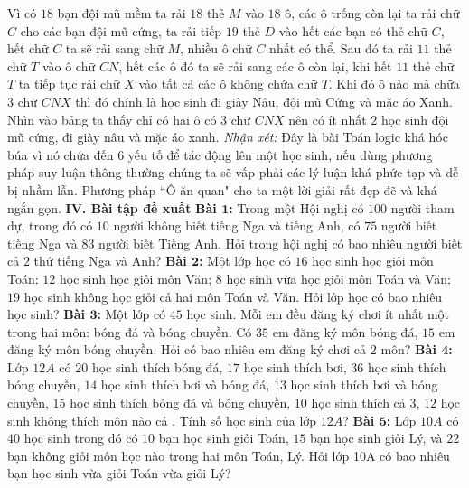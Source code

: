 \begin{multicols}{2}
\begin{figure}[H]
		\vspace*{-15pt}
	\end{figure}
	Vì có $18$ bạn đội mũ mềm ta rải $18$ thẻ $M$ vào $18$ ô, các ô trống còn lại ta rải chữ $C$ cho các bạn đội mũ cứng, ta rải tiếp $19$ thẻ $D$ vào hết các bạn có thẻ chữ $C$, hết chữ $C$ ta sẽ rải sang chữ $M$, nhiều ô chữ $C$ nhất có thể. Sau đó ta rải $11$ thẻ chữ $T$ vào ô chữ $CN$, hết các ô đó ta sẽ rải sang các ô còn lại, khi hết $11$ thẻ chữ $T$ ta tiếp tục rải chữ $X$ vào tất cả các ô không chứa chữ $T$. Khi đó ô nào mà chữa $3$ chữ $CNX$ thì đó chính là học sinh đi giày Nâu, đội mũ Cứng và mặc áo Xanh.
	\vskip 0.1cm
	Nhìn vào bảng ta thấy chỉ có hai ô có $3$ chữ $CNX$ nên có ít nhất $2$ học sinh đội mũ cứng, đi giày nâu và mặc áo xanh.
	\vskip 0.1cm
	\textit{Nhận xét:} Đây là bài Toán logic khá hóc búa vì nó chứa đến $6$ yếu tố để tác động lên một học sinh, nếu dùng phương pháp suy luận thông thường chúng ta sẽ vấp phải các lý luận khá phức tạp và dễ bị nhầm lẫn. Phương pháp ``Ô ăn quan" cho ta một lời giải rất đẹp đẽ và khá ngắn gọn.
	\vskip 0.1cm
	\textbf{\color{diendantoanhoc}IV. Bài tập đề xuất}
	\vskip 0.1cm
	\textbf{\color{diendantoanhoc}Bài $\pmb1$:} Trong một Hội nghị có $100$ người tham dự, trong đó có $10$ người không biết tiếng Nga và tiếng Anh, có $75$ người biết tiếng Nga và $83$ người biết Tiếng Anh. Hỏi trong hội nghị có bao nhiêu người biết cả $2$ thứ tiếng Nga và Anh?
	\vskip 0.1cm
	\textbf{\color{diendantoanhoc}Bài $\pmb2$:} Một lớp học có $16$ học sinh học giỏi môn Toán; $12$ học sinh học giỏi môn Văn; $8$ học sinh vừa học giỏi môn Toán và Văn; $19$ học sinh không học giỏi cả hai môn Toán và Văn. Hỏi lớp học có bao nhiêu học sinh?
	\vskip 0.1cm
	\textbf{\color{diendantoanhoc}Bài $\pmb3$:} Một lớp có $45$ học sinh. Mỗi em đều đăng ký chơi ít nhất một trong hai môn: bóng đá và bóng chuyền. Có $35$ em đăng ký môn bóng đá, $15$ em đăng ký môn bóng chuyền. Hỏi có bao nhiêu em đăng ký chơi cả $2$ môn?
	\vskip 0.1cm
	\textbf{\color{diendantoanhoc}Bài $\pmb4$:} Lớp $12A$ có $20$ học sinh thích bóng đá, $17$ học sinh thích bơi, $36$ học sinh thích bóng chuyền, $14$ học sinh thích bơi và bóng đá, $13$ học sinh thích bơi và bóng chuyền, $15$ học sinh thích bóng đá và bóng chuyền, $10$ học sinh thích cả $3$, $12$ học sinh không thích môn nào cả . Tính số học sinh của lớp $12A$?
	\vskip 0.1cm
	\textbf{\color{diendantoanhoc}Bài $\pmb5$:} Lớp $10A$ có $40$ học sinh trong đó có $10$ bạn học sinh giỏi Toán, $15$ bạn học sinh giỏi Lý, và $22$ bạn không giỏi môn học nào trong hai môn Toán, Lý. Hỏi lớp 10A có bao nhiêu bạn học sinh vừa giỏi Toán vừa giỏi Lý?

\end{multicols}
